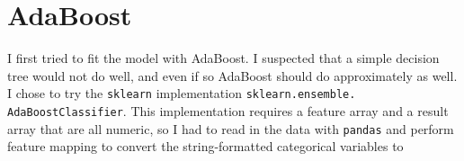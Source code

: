 \documentclass{article}
\begin{document}
    \section{AdaBoost}
        I first tried to fit the model with AdaBoost. I suspected that a simple decision tree would not do well, and even if so AdaBoost should do approximately as well. I chose to try the \lstinline{sklearn} implementation \lstinline{sklearn.ensemble. AdaBoostClassifier}. This implementation requires a feature array and a result array that are all numeric, so I had to read in the data with \lstinline{pandas} and perform feature mapping to convert the string-formatted categorical variables to 

            
\end{document}
